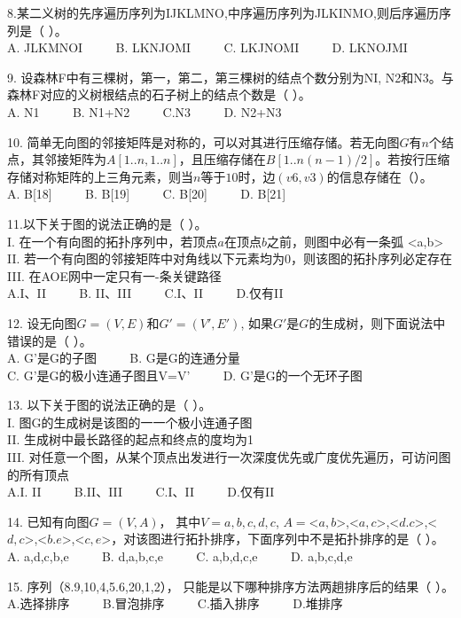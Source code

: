8.某二义树的先序遍历序列为IJKLMNO,中序遍历序列为JLKINMO,则后序遍历序列是（ ）。 \\
A. JLKMNOI $\qquad$ B. LKNJOMI $\qquad$ C. LKJNOMI $\qquad$ D. LKNOJMI

9. 设森林F中有三棵树，第一，第二，第三棵树的结点个数分别为NI, N2和N3。与森林F对应的义树根结点的石子树上的结点个数是（    ）。 \\
A. N1 $\qquad$ B. N1+N2 $\qquad$ C.N3 $\qquad$ D. N2+N3

10. 简单无向图的邻接矩阵是对称的，可以对其进行压缩存储。若无向图$G$有$n$个结点，其邻接矩阵为$A[1..n,1..n]$，且压缩存储在$B[1..n(n-1)/2]$。若按行压缩存储对称矩阵的上三角元素，则当$n$等于$10$时，边$(v6, v3)$的信息存储在（）。 \\
A. B[18] $\qquad$ B. B[19] $\qquad$ C. B[20] $\qquad$ D. B[21]

11.以下关于图的说法正确的是（    ）。 \\
I. 在一个有向图的拓扑序列中，若顶点$a$在顶点$b$之前，则图中必有一条弧 <a,b> \\
II. 若一个有向图的邻接矩阵中对角线以下元素均为0，则该图的拓扑序列必定存在 \\
III. 在AOE网中一定只有一-条关键路径 \\
A.I、II $\qquad$ B. II、III $\qquad$ C.I、II $\qquad$ D.仅有II

12. 设无向图$G=(V, E)$和$G'=(V',E')$, 如果$G'$是$G$的生成树，则下面说法中错误的是（    ）。 \\
A. G'是G的子图 $\qquad$ B. G是G的连通分量 \\
C. G’是G的极小连通子图且V=V' $\qquad$ D. G'是G的一个无环子图

13. 以下关于图的说法正确的是（    ）。 \\
I. 图G的生成树是该图的一一个极小连通子图 \\
II. 生成树中最长路径的起点和终点的度均为1 \\
III. 对任意一个图，从某个顶点出发进行一次深度优先或广度优先遍历，可访问图的所有顶点 \\
A.I. II $\qquad$ B.II、III $\qquad$ C.I、II $\qquad$ D.仅有II

14. 已知有向图$G=(V,A)$， 其中$V=${$a,b,c,d,c$}, $A=${<$a,b$>,<$a,c$>,<$d.c$>,<$d,c$>,<$b.e$>,<$c,e$>}，对该图进行拓扑排序，下面序列中不是拓扑排序的是（    ）。 \\
A. a,d,c,b,e $\qquad$ B. d,a,b,c,e $\qquad$ C. a,b,d,c,e $\qquad$ D. a,b,c,d,e

15. 序列（8.9,10,4,5.6,20,1,2）， 只能是以下哪种排序方法两趟排序后的结果（    ）。 \\
A.选择排序 $\qquad$ B.冒泡排序 $\qquad$ C.插入排序 $\qquad$ D.堆排序

